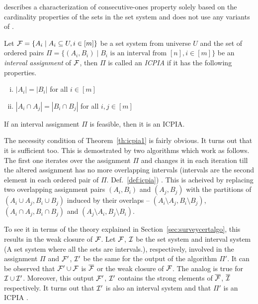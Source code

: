\cite{nsnrs09} describes a characterization of consecutive-ones
property solely based on the cardinality properties of the sets in the
set system and does not use any variants of \PQtrees. 

\begin{definition}
  \label{def:icpia}
  Let ${\cal F} = \{A_i \mid A_i \subseteq U, i \in [m]\}$ be a set system
  from universe $U$ and the set of ordered pairs $\Pi = \{(A_i, B_i)
  \mid B_i  \text{ is an interval from } [n], i \in [m]\}$ be an {\em interval
    assignment} of ${\cal F}$, then $\Pi$ is called an {\em ICPIA} if it has
  the following properties.
  \begin{enumerate}[i.]
  \item $|A_i| = |B_i|$ for all $i \in [m]$
  \item $|A_i \cap A_j| = |B_i \cap B_j|$ for all $i, j \in [m]$
  \end{enumerate}
\end{definition}

\begin{theoremsansproof}
  \label{th:icpia1}
  If an interval assignment $\Pi$ is feasible, then it is an ICPIA.
\end{theoremsansproof}

The necessity condition of Theorem~\ref{th:icpia1} is fairly
obvious. It turns out that it is sufficient too.  This is demostrated
by two algorithms which work as follows. The first one iterates over
the assignment $\Pi$ %
and changes it in each iteration till the altered
assignment %
has no more overlapping intervals (intervals are the second
  element in each ordered pair of $\Pi$. Def.~\ref{def:icpia}) %
\cite[Alg.~1]{nsnrs09}. This is acheived by replacing two overlapping
assignment pairs $(A_i, B_i)$ and $(A_j, B_j)$ with the partitions of
$(A_i \cup A_j,B_i \cup B_j)$ induced by their overlaps -- $(A_i
\setminus A_j, B_i \setminus B_j)$, $(A_i \cap A_j, B_i \cap B_j)$ and
$(A_j \setminus A_i, B_j \setminus B_i)$.

To see it in terms of the theory explained in
Section~\ref{sec:surveycertalgo}, this results in the weak closure of
${\cal F}$. Let ${\cal F}$, ${\cal I}$ be the set system and interval
system (A set system where all the sets are intervals.),
respectively, involved in the assignment $\Pi$ and ${\cal F}'$, ${\cal I}'$ be
the same for the output of the algorithm $\Pi'$.  It can be observed
that ${\cal F}' \cup {\cal F}$ is $\overline{{\cal F}}$ or the weak closure of
${\cal F}$. The analog is true for ${\cal I} \cup {\cal I}'$.  Moreover, this output
${\cal F}'$, ${\cal I}'$ contains the strong elements of $\overline{{\cal F}}$,
$\overline{{\cal I}}$ respectively. It turns out that ${\cal I}'$ is also an
interval system and that $\Pi'$ is an ICPIA \cite[Lem.~2]{nsnrs09}.

